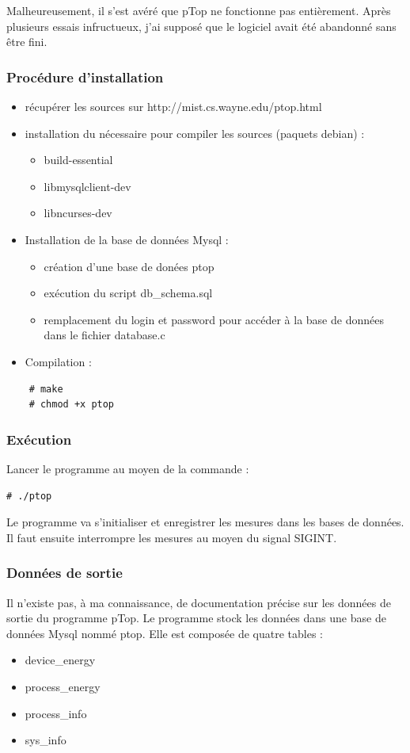 \documentclass[a4paper, 11pt]{report}
\begin{document}
Malheureusement, il s'est avéré que pTop ne fonctionne pas entièrement. Après plusieurs essais infructueux, j'ai supposé que le logiciel avait été abandonné sans être fini.

			\subsubsection{Procédure d'installation}
\begin{itemize}
    \item récupérer les sources sur http://mist.cs.wayne.edu/ptop.html
    \item installation du nécessaire pour compiler les sources (paquets debian) :
    \begin{itemize}
	\item build-essential
	\item libmysqlclient-dev
	\item libncurses-dev
    \end{itemize}
    \item Installation de la base de données Mysql :
    \begin{itemize}
	\item création d’une base de donées ptop
	\item exécution du script db\_schema.sql
	\item remplacement du login et password pour accéder à la base de données dans le fichier database.c
    \end{itemize}
    \item Compilation :
\end{itemize}

\begin{verbatim}
	# make
	# chmod +x ptop
\end{verbatim}

\subsubsection{Exécution}
Lancer le programme au moyen de la commande :

\begin{verbatim}
# ./ptop
\end{verbatim}

Le programme va s'initialiser et enregistrer les mesures dans les bases de données. Il faut ensuite interrompre les mesures au moyen du signal SIGINT.

\subsubsection{Données de sortie}
Il n’existe pas, à ma connaissance, de documentation précise sur les données de sortie du programme pTop.  Le programme stock les données dans une base de données Mysql nommé ptop. Elle est composée de quatre tables :
\begin{itemize}
	\item device\_energy
	\item process\_energy
	\item process\_info
	\item sys\_info
\end{itemize}
\end{document}
